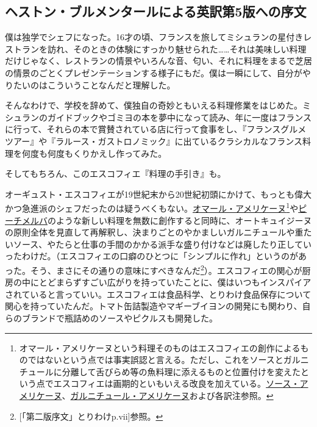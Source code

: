 \setlength{\parindent}{1\zw}

\vspace*{4\zw}

\begin{main}

\hypertarget{preface-heston-blumenthal}{%
\section{ヘストン・ブルメンタールによる英訳第5版への序文}\label{preface-heston-blumenthal}}

\vspace{2\zw}
\thispagestyle{empty}

僕は独学でシェフになった。16才の頃、フランスを旅してミシュランの星付きレストランを訪れ、そのときの体験にすっかり魅せられた\ldots{}\ldots{}それは美味しい料理だけじゃなく、レストランの情景やいろんな音、匂い、それに料理をまるで芝居の情景のごとくプレゼンテーションする様子にもだ。僕は一瞬にして、自分がやりたいのはこういうことなんだと理解した。

そんなわけで、学校を辞めて、僕独自の奇妙ともいえる料理修業をはじめた。ミシュランのガイドブックやゴミヨの本を夢中になって読み、年に一度はフランスに行って、それらの本で賞賛されている店に行って食事をし、『フランスグルメツアー』や『ラルース・ガストロノミック』に出ているクラシカルなフランス料理を何度も何度もくりかえし作ってみた。

そしてもちろん、このエスコフィエ『料理の手引き』も。

オーギュスト・エスコフィエが19世紀末から20世紀初頭にかけて、もっとも偉大かつ急進派のシェフだったのは疑うべくもない。\protect\hyperlink{homard-americaine}{オマール・アメリケーヌ}\footnote{オマール・アメリケーヌという料理そのものはエスコフィエの創作によるものではないという点では事実誤認と言える。ただし、これをソースとガルニチュールに分離して舌びらめ等の魚料理に添えるものと位置付けを変えたという点でエスコフィエは画期的といもいえる改良を加えている。\protect\hyperlink{sauce-americaine}{ソース・アメリケーヌ}、\protect\hyperlink{garniture-americaine}{ガルニチュール・アメリケーヌ}および各訳注参照。}や\protect\hyperlink{peches-melba}{ピーチメルバ}のような新しい料理を無数に創作すると同時に、オートキュイジーヌの原則全体を見直して再解釈し、決まりごとのやかましいガルニチュールや重たいソース、やたらと仕事の手間のかかる派手な盛り付けなどは廃したり正していったわけだ。（エスコフィエの口癖のひとつに「シンプルに作れ」というのがあった。そう、まさにその通りの意味にすべきなんだ\footnote{{[}「第二版序文」とりわけp.vii{]}参照。}）。エスコフィエの関心が厨房の中にとどまらずすごい広がりを持っていたことに、僕はいつもインスパイアされていると言っていい。エスコフィエは食品科学、とりわけ食品保存について関心を持っていたんだ。トマト缶詰製造やマギーブイヨンの開発にも関わり、自らのブランドで瓶詰めのソースやピクルスも開発した。


\end{main}
